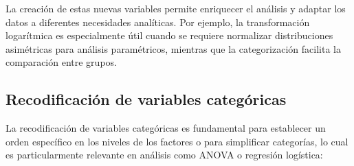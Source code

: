 \documentclass[
  spanish,
  a4paper,
  DIV=11,
  numbers=noendperiod,
  onepage,
  openany]{scrreprt}
\newenvironment{Shaded}{\begin{snugshade}}{\end{snugshade}}
\newcommand{\AttributeTok}[1]{\textcolor[rgb]{0.40,0.45,0.13}{#1}}
\newcommand{\CommentTok}[1]{\textcolor[rgb]{0.37,0.37,0.37}{#1}}
\newcommand{\DecValTok}[1]{\textcolor[rgb]{0.68,0.00,0.00}{#1}}
\newcommand{\DocumentationTok}[1]{\textcolor[rgb]{0.37,0.37,0.37}{\textit{#1}}}
\newcommand{\FunctionTok}[1]{\textcolor[rgb]{0.28,0.35,0.67}{#1}}
\newcommand{\NormalTok}[1]{\textcolor[rgb]{0.00,0.23,0.31}{#1}}
\newcommand{\OtherTok}[1]{\textcolor[rgb]{0.00,0.23,0.31}{#1}}
\newcommand{\SpecialCharTok}[1]{\textcolor[rgb]{0.37,0.37,0.37}{#1}}
\newcommand{\StringTok}[1]{\textcolor[rgb]{0.13,0.47,0.30}{#1}}
\begin{document}
La creación de estas nuevas variables permite enriquecer el análisis y
adaptar los datos a diferentes necesidades analíticas. Por ejemplo, la
transformación logarítmica es especialmente útil cuando se requiere
normalizar distribuciones asimétricas para análisis paramétricos,
mientras que la categorización facilita la comparación entre grupos.

\subsection{Recodificación de variables
categóricas}\label{recodificaciuxf3n-de-variables-categuxf3ricas}

La recodificación de variables categóricas es fundamental para
establecer un orden específico en los niveles de los factores o para
simplificar categorías, lo cual es particularmente relevante en análisis
como ANOVA o regresión logística:

\begin{Shaded}
\end{Shaded}
\end{document}

